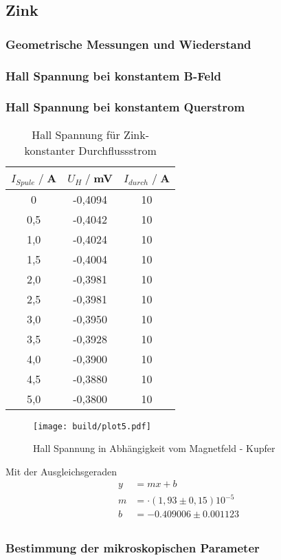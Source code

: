 \subsection{Zink}
\subsubsection{Geometrische Messungen und Wiederstand}
\subsubsection{Hall Spannung bei konstantem B-Feld}
\subsubsection{Hall Spannung bei konstantem Querstrom}
\begin{table}
    \centering
    \begin{tabular}{c c c}
        \toprule
        $I_{Spule} \;/\;$A & $U_H\;/\;$mV & $I_{durch} \;/\;$A\\
        \midrule
            0                   &-0,4094&             10\\
            0,5                 &-0,4042&             10\\
            1,0                 &-0,4024&             10\\
            1,5                 &-0,4004&             10\\
            2,0                 &-0,3981&             10\\
            2,5                 &-0,3981&             10\\
            3,0                 &-0,3950&             10\\
            3,5                 &-0,3928&             10\\
            4,0                 &-0,3900&             10\\
            4,5                 &-0,3880&             10\\
            5,0                 &-0,3800&             10\\
        \bottomrule
    \end{tabular}
    \caption{Hall Spannung für Zink- konstanter Durchflussstrom}
    \label{tab:Zn_I}
\end{table}
\begin{figure}[H]
    \centering
    \texttt{[image: build/plot5.pdf]}
    \caption{Hall Spannung in Abhängigkeit vom Magnetfeld - Kupfer}
    \label{fig:Zn_I}
\end{figure}
Mit der Ausgleichsgeraden
\begin{align*}
    y &= mx + b\\
    m &= \cdot (1,93\pm0,15)10^{-5}\\ %
    b &=  -0.409006\pm 0.001123\\ %
\end{align*}

\subsubsection{Bestimmung der mikroskopischen Parameter}
\label{sec:Auswertung}
